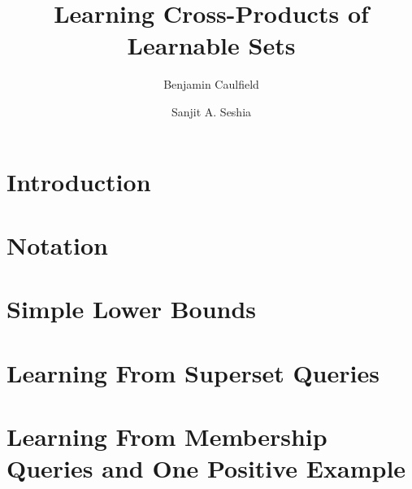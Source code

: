 

\title{Learning Cross-Products of Learnable Sets}
\author{Benjamin Caulfield}
\author{Sanjit A. Seshia}
\address{Electrical Engineering and Computer Science\\ University of California, Berkeley}



\maketitle

\begin{abstract}

\end{abstract}

\section{Introduction}


\section{Notation}



\section{Simple Lower Bounds}


\section{Learning From Superset Queries}


\section{Learning From Membership Queries and One Positive Example}



